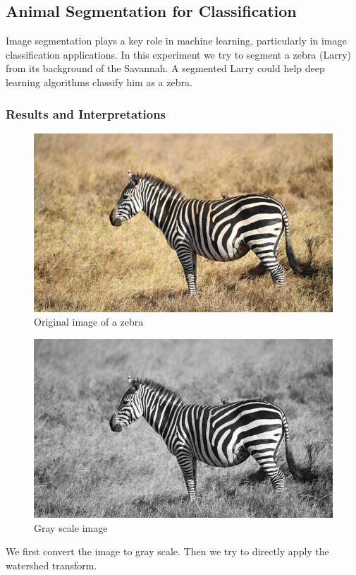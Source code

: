 \documentclass{article}
\begin{document}

\subsection{Animal Segmentation for Classification}
\begin{flushleft}
Image segmentation plays a key role in machine learning, particularly in image classification applications. In this experiment we try to segment a zebra (Larry) from its background of the Savannah. A segmented Larry could help deep learning algorithms classify him as a zebra.
\end{flushleft}

\subsubsection{Results and Interpretations}
\begin{figure}[H]
  \centering
    \includegraphics[scale=0.3]{experiments/zebra/zebra.jpg}
    \caption{Original image of a zebra}
    \label{fig:zebra_1}
\end{figure}
\begin{figure}[H]
  \centering
  \includegraphics[scale=.3]{experiments/zebra/zebraGray.jpg}
  \caption{Gray scale image}
  \label{fig:zebra_2}
\end{figure}
\begin{flushleft}
We first convert the image to gray scale. Then we try to directly apply the watershed transform.
\end{flushleft}
\end{document}
